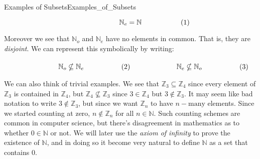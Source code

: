 \begin{fexample}{Examples of Subsets}{Examples_of_Subsets}
\begin{subequations}
\begin{minipage}[b]{0.49\textwidth}
\begin{equation}
                        \mathbb{N}_{e}=\mathbb{N}
                    \end{equation}
                \end{minipage}
            \end{subequations}
            \par\vspace{2.5ex}
            Moreover we see that $\mathbb{N}_{o}$ and $\mathbb{N}_{e}$
            have no elements in common. That is, they are
            \textit{disjoint}. We can represent this symbolically by
            writing:
            \par\hfill\par
            \begin{subequations}
                \begin{minipage}[b]{0.49\textwidth}
                    \begin{equation}
                        \mathbb{N}_{o}\nsubseteq\mathbb{N}_{e}
                    \end{equation}
                \end{minipage}
                \hfill
                \begin{minipage}[b]{0.49\textwidth}
                    \begin{equation}
                        \mathbb{N}_{e}\nsubseteq\mathbb{N}_{o}
                    \end{equation}
                \end{minipage}
            \end{subequations}
            \par\vspace{2.5ex}
            We can also think of trivial examples. We see that
            $\mathbb{Z}_{3}\subseteq\mathbb{Z}_{4}$ since every element
            of $\mathbb{Z}_{3}$ is contained in $\mathbb{Z}_{4}$, but
            $\mathbb{Z}_{4}\nsubseteq\mathbb{Z}_{3}$ since
            $3\in\mathbb{Z}_{4}$ but $3\notin\mathbb{Z}_{3}$. It may seem
            like bad notation to write $3\notin\mathbb{Z}_{3}$, but since we
            want $\mathbb{Z}_{n}$ to have $n-\textrm{many}$ elements. Since we
            started counting at zero, $n\notin\mathbb{Z}_{n}$ for all
            $n\in\mathbb{N}$. Such counting schemes are common in computer
            science, but there's disagreement in mathematics as to whether
            $0\in\mathbb{N}$ or not. We will later use the
            \textit{axiom of infinity} to prove the existence of $\mathbb{N}$,
            and in doing so it become very natural to define $\mathbb{N}$ as
            a set that contains $0$.
        \end{fexample}
